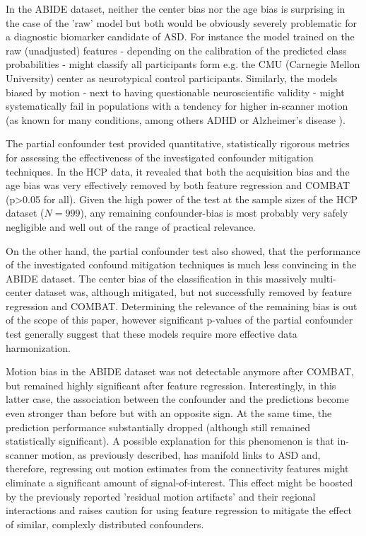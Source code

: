 \documentclass{article}
\begin{document}
In the ABIDE dataset, neither the center bias nor the age bias is surprising in the case of the 'raw' model but both would be obviously severely problematic for a diagnostic biomarker candidate of ASD. For instance the model trained on the raw (unadjusted) features - depending on the calibration of the predicted class probabilities - might classify all participants form e.g. the CMU (Carnegie Mellon University) center as neurotypical control participants. Similarly, the models biased by motion - next to having questionable neuroscientific validity - might systematically fail in populations with a tendency for higher in-scanner motion (as known for many conditions, among others ADHD\citep{eloyan2012automated} or Alzheimer's disease \citep{rao2017predictive}).
 
 The partial confounder test provided quantitative, statistically rigorous metrics for assessing the effectiveness of the investigated confounder mitigation techniques. In the HCP data, it revealed that both the acquisition bias and the age bias was very effectively removed by both feature regression and COMBAT (p>0.05 for all). Given the high power of the test at the sample sizes of the HCP dataset ($N=999$), any remaining confounder-bias is most probably very safely negligible and well out of the range of practical relevance.
 
On the other hand, the partial confounder test also showed, that the performance of the investigated confound mitigation techniques is much less convincing in the ABIDE dataset. The center bias of the classification in this massively multi-center dataset was, although mitigated, but not successfully removed by feature regression and COMBAT. Determining the relevance of the remaining bias is out of the scope of this paper, however significant p-values of the partial confounder test generally suggest that these models require more effective data harmonization.

Motion bias in the ABIDE dataset was not detectable anymore after COMBAT, but remained highly significant after feature regression.
Interestingly, in this latter case, the association between the confounder and the predictions become even stronger than before but with an opposite sign. At the same time, the prediction performance substantially dropped (although still remained statistically significant). 
A possible explanation for this phenomenon is that in-scanner motion, as previously described\citep{fournier2010motor, anzulewicz2016toward}, has manifold links to ASD and, therefore, regressing out motion estimates from the connectivity features might eliminate a significant amount of signal-of-interest. This effect might be boosted by the previously reported 'residual motion artifacts' and their regional interactions\citep{spisak2014voxel} and raises caution for using feature regression to mitigate the effect of similar, complexly distributed confounders.
 
\end{document}
